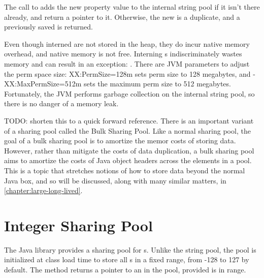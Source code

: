 The call to  adds the new property value 
 to the internal string
pool if it isn't there already, and return a pointer to it. Otherwise, the
new  is a duplicate, and a previously saved  is
returned.

Even though interned  are not stored in the heap, they do incur
native memory overhead, and native memory is not free.
 Interning s indiscriminately wastes memory and can result in an
 exception: . 
There are JVM parameters to adjust the perm space size:
XX:PermSize=128m sets perm size to 128 megabytes, and -XX:MaxPermSize=512m sets
the maximum perm size to 512 megabytes. Fortunately, the JVM performs garbage
collection on the internal string pool, so there is no danger of a memory leak.

TODO: shorten this to a quick forward reference. There is an
important variant of a sharing pool called the Bulk Sharing Pool. Like a normal sharing pool, the goal of a bulk sharing pool is to amortize the
memor costs of storing data. However, rather than mitigate the costs of data
duplication, a bulk sharing pool aims to amortize the costs of Java object
headers across the elements in a pool. This is a topic that stretches notions of
how to store data beyond the normal Java box, and so will be discussed, along
with many similar matters, in \autoref{chapter:large-long-lived}.

\section{Integer Sharing Pool}

The Java library provides a sharing pool for s. 
Unlike the string pool, the  pool is initialized at class load
time to store all s in a fixed range, from -128 to 127 by
default. The method  returns a pointer to an  
in the pool, provided  is in range.

